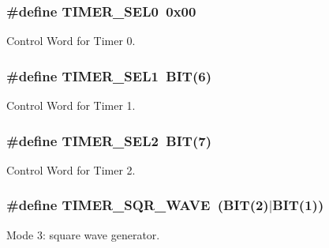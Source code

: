 \subsubsection[{\texorpdfstring{T\+I\+M\+E\+R\+\_\+\+S\+E\+L0}{TIMER_SEL0}}]{\setlength{\rightskip}{0pt plus 5cm}\#define T\+I\+M\+E\+R\+\_\+\+S\+E\+L0~0x00}\hypertarget{group__i8254_ga6a4822642d40c248435692324a818010}{}\label{group__i8254_ga6a4822642d40c248435692324a818010}


Control Word for Timer 0. 

\subsubsection[{\texorpdfstring{T\+I\+M\+E\+R\+\_\+\+S\+E\+L1}{TIMER_SEL1}}]{\setlength{\rightskip}{0pt plus 5cm}\#define T\+I\+M\+E\+R\+\_\+\+S\+E\+L1~{\bf B\+IT}(6)}\hypertarget{group__i8254_ga8349623fd8d99f9cc5d8ae29d78594fc}{}\label{group__i8254_ga8349623fd8d99f9cc5d8ae29d78594fc}


Control Word for Timer 1. 

\subsubsection[{\texorpdfstring{T\+I\+M\+E\+R\+\_\+\+S\+E\+L2}{TIMER_SEL2}}]{\setlength{\rightskip}{0pt plus 5cm}\#define T\+I\+M\+E\+R\+\_\+\+S\+E\+L2~{\bf B\+IT}(7)}\hypertarget{group__i8254_ga142a255de0dbc48aeabd45fc10c33672}{}\label{group__i8254_ga142a255de0dbc48aeabd45fc10c33672}


Control Word for Timer 2. 

\subsubsection[{\texorpdfstring{T\+I\+M\+E\+R\+\_\+\+S\+Q\+R\+\_\+\+W\+A\+VE}{TIMER_SQR_WAVE}}]{\setlength{\rightskip}{0pt plus 5cm}\#define T\+I\+M\+E\+R\+\_\+\+S\+Q\+R\+\_\+\+W\+A\+VE~({\bf B\+IT}(2)$\vert${\bf B\+IT}(1))}\hypertarget{group__i8254_ga4745cbf21da3d3fea5dbb080b2b73bac}{}\label{group__i8254_ga4745cbf21da3d3fea5dbb080b2b73bac}


Mode 3\+: square wave generator. 

